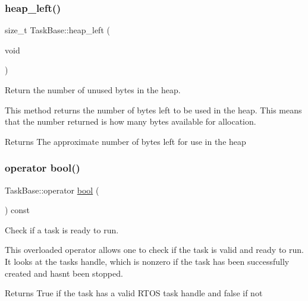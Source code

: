 \subsubsection{\texorpdfstring{heap\+\_\+left()}{heap\_left()}}
{\footnotesize\ttfamily size\+\_\+t Task\+Base\+::heap\+\_\+left (\begin{DoxyParamCaption}\item[{void}]{ }\end{DoxyParamCaption})\hspace{0.3cm}{\ttfamily [inline]}}



Return the number of unused bytes in the heap. 

This method returns the number of bytes left to be used in the heap. This means that the number returned is how many bytes available for allocation. \begin{DoxyReturn}{Returns}
The approximate number of bytes left for use in the heap 
\end{DoxyReturn}
\mbox{\label{class_task_base_a0dbf9678429543f33c9c8f82511a3887}} 
\subsubsection{\texorpdfstring{operator bool()}{operator bool()}}
{\footnotesize\ttfamily Task\+Base\+::operator \mbox{\hyperlink{group___motor___boolean___type_ga0ecf26b576b9a54eca656b9be7ba6a06}{bool}} (\begin{DoxyParamCaption}{ }\end{DoxyParamCaption}) const\hspace{0.3cm}{\ttfamily [inline]}}



Check if a task is ready to run. 

This overloaded operator allows one to check if the task is valid and ready to run. It looks at the task\textquotesingle{}s handle, which is nonzero if the task has been successfully created and hasn\textquotesingle{}t been stopped. \begin{DoxyReturn}{Returns}
True if the task has a valid R\+T\+OS task handle and false if not 
\end{DoxyReturn}
\mbox{\label{class_task_base_a441138caa57e35f58f31dc4d960580d9}} 
